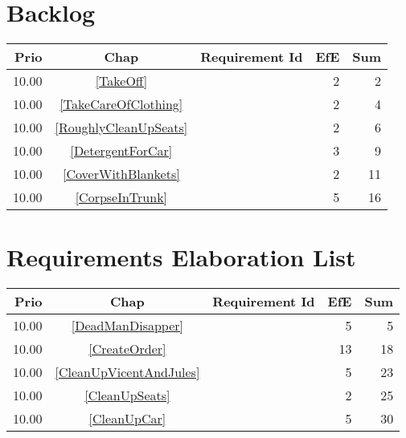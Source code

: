 \section{Backlog}
\begin{longtable}{|r|c|p{7cm}||r|r|} \hline
\textbf{Prio} & \textbf{Chap} & \textbf{Requirement Id} & \textbf{EfE} & \textbf{Sum} \\ \hline\endhead
10.00 & \ref{TakeOff} & \nameref{TakeOff} & 2 & 2 \\ \hline
10.00 & \ref{TakeCareOfClothing} & \nameref{TakeCareOfClothing} & 2 & 4 \\ \hline
10.00 & \ref{RoughlyCleanUpSeats} & \nameref{RoughlyCleanUpSeats} & 2 & 6 \\ \hline
10.00 & \ref{DetergentForCar} & \nameref{DetergentForCar} & 3 & 9 \\ \hline
10.00 & \ref{CoverWithBlankets} & \nameref{CoverWithBlankets} & 2 & 11 \\ \hline
10.00 & \ref{CorpseInTrunk} & \nameref{CorpseInTrunk} & 5 & 16 \\ \hline
\end{longtable}\section{Requirements Elaboration List}
\begin{longtable}{|r|c|p{7cm}||r|r|} \hline
\textbf{Prio} & \textbf{Chap} & \textbf{Requirement Id} & \textbf{EfE} & \textbf{Sum} \\ \hline\endhead
10.00 & \ref{DeadManDisapper} & \nameref{DeadManDisapper} & 5 & 5 \\ \hline
10.00 & \ref{CreateOrder} & \nameref{CreateOrder} & 13 & 18 \\ \hline
10.00 & \ref{CleanUpVicentAndJules} & \nameref{CleanUpVicentAndJules} & 5 & 23 \\ \hline
10.00 & \ref{CleanUpSeats} & \nameref{CleanUpSeats} & 2 & 25 \\ \hline
10.00 & \ref{CleanUpCar} & \nameref{CleanUpCar} & 5 & 30 \\ \hline
\end{longtable}
